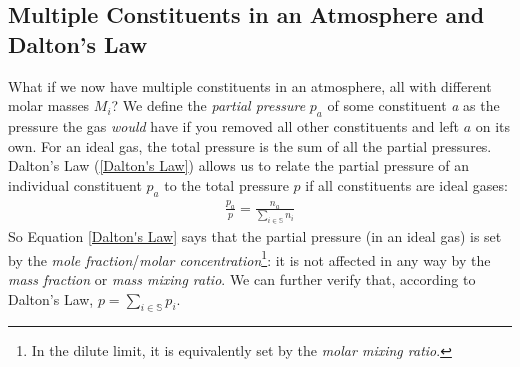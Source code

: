 \subsection{Multiple Constituents in an Atmosphere and Dalton's Law}\label{Multiple Dalt}

What if we now have multiple constituents in an atmosphere, all with different molar masses $M_i$? We define the \textit{partial pressure} $p_a$ of some constituent \textit{a} as the pressure the gas \textit{would} have if you removed all other constituents and left $a$ on its own. For an ideal gas, the total pressure is the sum of all the partial pressures. Dalton's Law (\ref{Dalton's Law}) allows us to relate the partial pressure of an individual constituent $p_a$ to the total pressure $p$ if all constituents are ideal gases:
\begin{align}\label{Dalton's Law}
    \boxed{\frac{p_a}{p}=\frac{n_a}{\sum\limits_{i\in\mathbb{S}} n_i}}
\end{align}
So Equation \ref{Dalton's Law} says that the partial pressure (in an ideal gas) is set by the \textit{mole fraction}/\textit{molar concentration}\footnote{
    In the dilute limit, it is equivalently set by the \textit{molar mixing ratio}.
}: it is not affected in any way by the \textit{mass fraction} or \textit{mass mixing ratio}. We can further verify that, according to Dalton's Law, $p=\sum\limits_{i\in\mathbb{S}} p_i$. 


